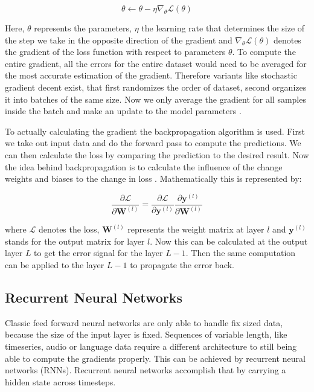 \documentclass[twoside,a4paper,10pt,DIV=12,BCOR=12mm]{scrartcl}
\begin{document}
$$ \theta \leftarrow \theta - \eta \nabla_{\theta}\mathcal{L}(\theta)$$

Here, $\theta$ represents the parameters, $\eta$ the learning rate that determines the size of the step we take in 
the opposite direction of the gradient and $\nabla_{\theta}\mathcal{L}(\theta)$ denotes the gradient 
of the loss function with respect to parameters $\theta$. To compute the entire gradient, all the errors for the 
entire dataset would need to be averaged for the most accurate estimation of the gradient. Therefore variants 
like stochastic gradient decent exist, that first randomizes the order of dataset, second organizes it into batches of
the same size. Now we only average the gradient for all samples inside the batch and make an update to the model parameters \cite{Bottou10}.


To actually calculating the gradient the backpropagation algorithm is used. First we take out input data and do the
forward pass to compute the predictions. We can then calculate the loss by comparing the prediction to the desired result.
Now the idea behind backpropagation is to calculate the influence of the change weights and biases to the change in loss \cite{Rumelhart86}.
Mathematically this is represented by:


$$
\frac{\partial \mathcal{L}}{\partial \mathbf{W}^{(l)}} = \frac{\partial \mathcal{L}}{\partial \mathbf{y}^{(l)}} \frac{\partial \mathbf{y}^{(l)}}{\partial \mathbf{W}^{(l)}}
$$


where $\mathcal{L}$ denotes the loss, $\mathbf{W}^{(l)}$ represents the weight matrix at layer $l$ and $\mathbf{y}^{(l)}$ stands for the output matrix
for layer $l$. Now this can be calculated at the output layer $L$ to get the error signal for the layer $L-1$. 
Then the same computation can be applied to the layer $L-1$ to propagate the error back.

\subsection{Recurrent Neural Networks}

Classic feed forward neural networks are only able to handle fix sized data, because the size of the input layer
is fixed. Sequences of variable length, like timeseries, audio or language data require a different
architecture to still being able to compute the gradients properly. This can be achieved by recurrent
neural networks (RNNs). Recurrent neural networks accomplish that by carrying a hidden state across timesteps.
\end{document}
